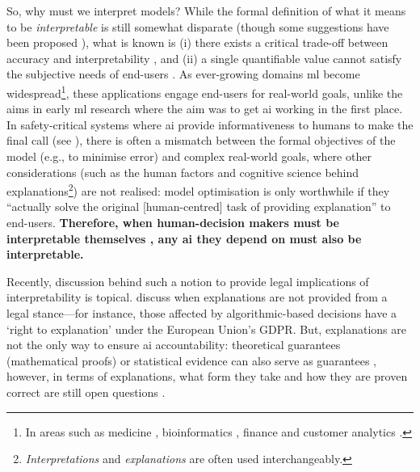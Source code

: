 So, why must we interpret models? While the formal definition of what it means to be \textit{interpretable} is still somewhat disparate (though some suggestions have been proposed \citep{Lipton:2016if}), what is known is (i) there exists a critical trade-off between accuracy and interpretability \citep{Freitas:2004vv,Jin:2006uf,Kaufman:1999vg,Grunwald:2007vg,Domingos:1998ug,Zahalka:2011ux}, and (ii) a single quantifiable value cannot satisfy the subjective needs of end-users \citep{Freitas:2014ic}. As ever-growing domains \gls{ml} become widespread\footnote{In areas such as medicine \citep{Bellazzi:2008tv,Lavrac:1999tf,Pazzani:2001tw,Richards:2001vw,Zupan:2000tp,VanAssche:2007wc,Johansson:2009uo,Elazmeh:2007tp,Wong:2006ve,Jaspers:2011hy,Bussone:2015wm}, bioinformatics \citep{Freitas:2010vk,Szafron:2004uf,Karwath:2002tv,Doderer:2006vt,Jiang:2005ua}, finance \citep{Baehrens:2010tj,Huysmans:2011gq,Dhar:2000vo} and customer analytics \citep{Verbeke:2011vo,Lima:2009tm}.}, these applications engage end-users for real-world goals, unlike the aims in early \gls{ml} research where the aim was to get \gls{ai} working in the first place. In safety-critical systems where \gls{ai} provide informativeness to humans to make the final call (see \citep{Caruana:2015jk,Kim:2015vo,Huysmans:2011gq}), there is often a mismatch between the formal objectives of the model (e.g., to minimise error) and complex real-world goals, where other considerations (such as the human factors and cognitive science behind explanations\footnote{\textit{Interpretations} and \textit{explanations} are often used interchangeably.}) are not realised: model optimisation is only worthwhile if they ``actually solve the original [human-centred] task of providing explanation'' \citep{Narayanan:2018ud} to end-users. \textbf{Therefore, when human-decision makers must be interpretable themselves \citep{Ridgeway:1998ud}, any \gls{ai} they depend on must also be interpretable.} 

Recently, discussion behind such a notion to provide legal implications of interpretability is topical. \citet{DoshiVelez:2017vm} discuss when explanations are not provided from a legal stance---for instance, those affected by algorithmic-based decisions have a `right to explanation' \citep{Goodman:2016wf,Wachter:2017hx} under the European Union's GDPR. But, explanations are not the only way to ensure \gls{ai} accountability: theoretical guarantees (mathematical proofs) or statistical evidence can also serve as guarantees \citep{DoshiVelez:2017vm}, however, in terms of explanations, what form they take and how they are proven correct are still open questions \citep{Lipton:2016if}.

